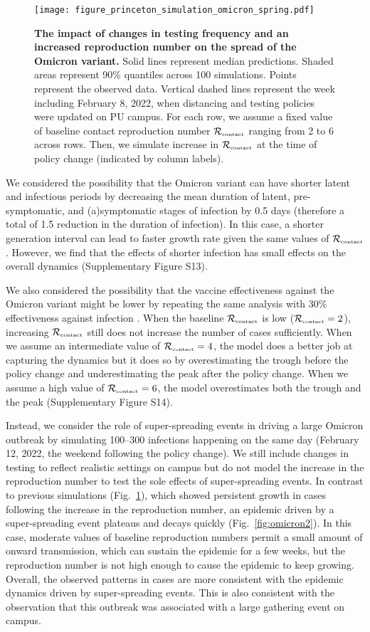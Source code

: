 \documentclass[12pt]{article}
\newcommand{\fref}[1]{Fig.~\ref{fig:#1}}
\newcommand{\Rx}[1]{\ensuremath{{\mathcal R}_{#1}}}
\newcommand{\Rc}{\Rx{\textrm{\tiny{contact}}}}
\begin{document}
\begin{figure}[!ht]
\texttt{[image: figure\_princeton\_simulation\_omicron\_spring.pdf]}
\caption{
\textbf{The impact of changes in testing frequency and an increased reproduction number on the spread of the Omicron variant.}
Solid lines represent median predictions.
Shaded areas represent 90\% quantiles across 100 simulations.
Points represent the observed data.
Vertical dashed lines represent the week including February 8, 2022, when distancing and testing policies were updated on PU campus.
For each row, we assume a fixed value of baseline contact reproduction number $\Rc$ ranging from 2 to 6 across rows.
Then, we simulate increase in $\Rc$ at the time of policy change (indicated by column labels).
}
\label{fig:omicron1}
\end{figure}

We considered the possibility that the Omicron variant can have shorter latent and infectious periods by decreasing the mean duration of latent, pre-symptomatic, and (a)symptomatic stages of infection by 0.5 days (therefore a total of 1.5 reduction in the duration of infection).
In this case, a shorter generation interval can lead to faster growth rate given the same values of $\Rc$ \citep{wallinga2007generation}.
However, we find that the effects of shorter infection has small effects on the overall dynamics (Supplementary Figure S13).

We also considered the possibility that the vaccine effectiveness against the Omicron variant might be lower by repeating the same analysis with 30\% effectiveness against infection \citep{tan2023vaccine}.
When the baseline $\Rc$ is low ($\Rc=2$), increasing $\Rc$ still does not increase the number of cases sufficiently.
When we assume an intermediate value of $\Rc=4$, the model does a better job at capturing the dynamics but it does so by overestimating the trough before the policy change and underestimating the peak after the policy change.
When we assume a high value of $\Rc=6$, the model overestimates both the trough and the peak (Supplementary Figure S14).

Instead, we consider the role of super-spreading events in driving a large Omicron outbreak by simulating 100--300 infections happening on the same day (February 12, 2022, the weekend following the policy change).
We still include changes in testing to reflect realistic settings on campus but do not model the increase in the reproduction number to test the sole effects of super-spreading events.
In contrast to previous simulations (\fref{omicron1}), which showed persistent growth in cases following the increase in the reproduction number, an epidemic driven by a super-spreading event plateaus and decays quickly (\fref{omicron2}).
In this case, moderate values of baseline reproduction numbers permit a small amount of onward transmission, which can sustain the epidemic for a few weeks, but the reproduction number is not high enough to cause the epidemic to keep growing.
Overall, the observed patterns in cases are more consistent with the epidemic dynamics driven by super-spreading events.
This is also consistent with the observation that this outbreak was associated with a large gathering event on campus.
\end{document}
